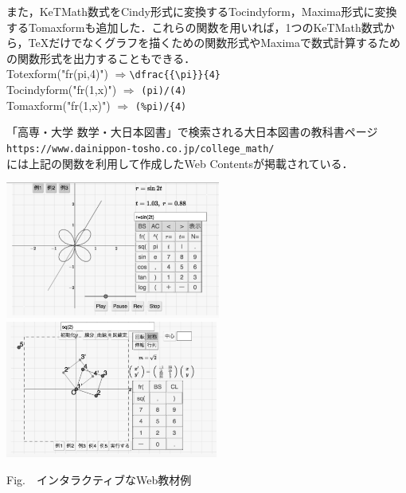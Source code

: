 \documentclass[a4j,12pt]{ujarticle}
\begin{document}
また，KeTMath数式をCindy形式に変換するTocindyform，Maxima形式に変換するTomaxformも追加した．これらの関数を用いれば，1つのKeTMath数式から，\TeX だけでなくグラフを描くための関数形式やMaximaで数式計算するための関数形式を出力することもできる．\\
\hspace*{4zw}Totexform("fr(pi,4)") $\Longrightarrow$\verb|\dfrac{{\pi}}{4}|\\
\hspace*{4zw}Tocindyform("fr(1,x)")  $\Longrightarrow$ \verb|(pi)/(4)|\\
\hspace*{4zw}Tomaxform("fr(1,x)")  $\Longrightarrow$ \verb|(%pi)/{4)|

\vspace{1mm}

\noindent
「高専・大学 数学・大日本図書」で検索される大日本図書の教科書ページ\\%
\hspace*{2zw}\verb|https://www.dainippon-tosho.co.jp/college_math/|\\
には上記の関数を利用して作成したWeb Contentsが掲載されている．


\begin{center}
\includegraphics[bb=0.00 0.00 906.00 577.00,height=45mm]{fig/dntcalbw.pdf}
%
\hspace{5mm}%
\includegraphics[bb=0.00 0.00 898.00 578.00,height=45mm]{fig/dntlinbw.pdf}

\addtocounter{figure}{1}Fig.\thefigure\ \ インタラクティブなWeb教材例\vspace{-1mm}

\end{center}
\end{document}
